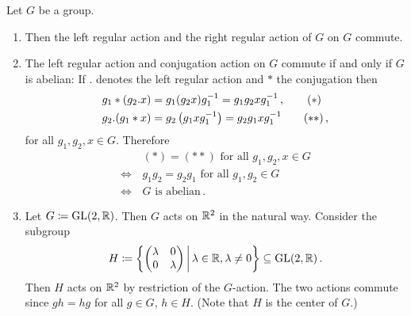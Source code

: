 \begin{example}
  \label{example: commuting actions}
  Let $G$ be a group.
  \begin{enumerate}
    \item
      Then the left regular action and the right regular action of $G$ on $G$ commute.
    \item
      The left regular action and conjugation action on $G$ commute if and only if $G$ is abelian:
      If $.$ denotes the left regular action and $*$ the conjugation then
      \begin{align*}
            g_1*(g_2.x)
        &=  g_1 (g_2 x) g_1^{-1}
         =  g_1 g_2 x g_1^{-1} \,,
        \tag{\ensuremath{\ast}}
        \\
            g_2.(g_1*x)
        &=  g_2 \left(g_1 x g_1^{-1}\right)
         =  g_2 g_1 x g_1^{-1}
        \tag{\ensuremath{\ast\ast}} \,,
      \end{align*}
      for all $g_1, g_2, x \in G$.
      Therefore
      \begin{align*}
            &\, \text{$(\ast) = (\ast\ast)$ for all $g_1, g_2, x \in G$}  \\
        \iff&\, \text{$g_1 g_2 = g_2 g_1$ for all $g_1, g_2 \in G$}       \\
        \iff&\, \text{$G$ is abelian} \,.
      \end{align*}
    \item
      Let $G \coloneqq \operatorname{GL}(2,\mathbb{R})$.
      Then $G$ acts on $\mathbb{R}^2$ in the natural way.
      Consider the subgroup
      \[
                  H
        \defined  \left\{
                    \begin{pmatrix}
                      \lambda & 0       \\
                      0       & \lambda
                    \end{pmatrix}
                  \suchthat*
                    \lambda \in \Real,
                    \lambda \neq 0
                  \right\}
        \subseteq \GL(2,\Real) \,.
      \]
      Then $H$ acts on $\mathbb{R}^2$ by restriction of the $G$-action.
      The two actions commute since $gh = hg$ for all $g \in G$, $h \in H$.
      (Note that $H$ is the center of $G$.)
  \end{enumerate}
\end{example}


